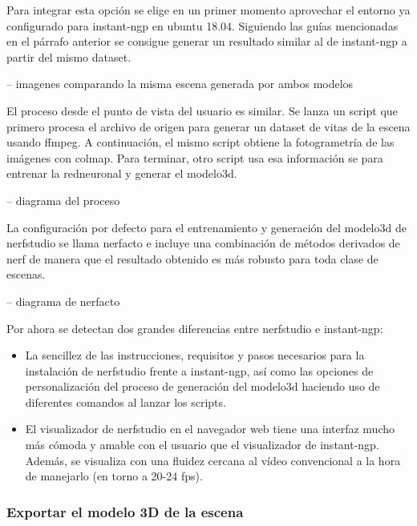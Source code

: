 \documentclass[a4paper, 12pt, spanish, twoside]{article}
\begin{document}
Para integrar esta opción se elige en un primer momento aprovechar el entorno ya configurado para \gls{instant-ngp} en \gls{ubuntu} 18.04. Siguiendo las guías mencionadas en el párrafo anterior se consigue generar un resultado similar al de \gls{instant-ngp} a partir del mismo \gls{dataset}. 

-- imagenes comparando la misma escena generada por ambos modelos 

El proceso desde el punto de vista del usuario es similar. Se lanza un \gls{script} que primero procesa el archivo de origen para generar un \gls{dataset} de vitas de la escena usando \gls{ffmpeg}. A continuación, el mismo \gls{script} obtiene la fotogrametría de las imágenes con \gls{colmap}. Para terminar, otro \gls{script} usa esa información se para entrenar la \gls{redneuronal} y generar el \gls{modelo3d}.  

-- diagrama del proceso 

La configuración por defecto para el entrenamiento y generación del \gls{modelo3d} de \gls{nerfstudio} se llama \gls{nerfacto} e incluye una combinación de métodos derivados de \acrshort{nerf} de manera que el resultado obtenido es más robusto para toda clase de escenas. 

-- diagrama de nerfacto 

Por ahora se detectan dos grandes diferencias entre \gls{nerfstudio} e \gls{instant-ngp}: 

\begin{itemize} 
\item La sencillez de las instrucciones, requisitos y pasos necesarios para la instalación de \gls{nerfstudio} frente a \gls{instant-ngp}, así como las opciones de personalización del proceso de generación del \gls{modelo3d} haciendo uso de diferentes comandos al lanzar los \glspl{script}. 
\item El visualizador de \gls{nerfstudio} en el navegador web tiene una interfaz mucho más cómoda y amable con el usuario que el visualizador de \gls{instant-ngp}. Además, se visualiza con una fluidez cercana al vídeo convencional a la hora de manejarlo (en torno a 20-24 \acrshort{fps}). 
\end{itemize} 

\subsubsection{Exportar el modelo 3D de la escena} \label{sec:implementacion:nerfstudio-volinga:exportar}
\end{document}
